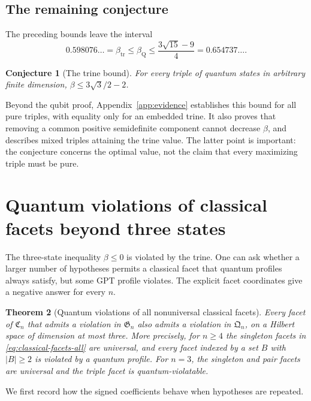 \documentclass[a4paper,11pt,onecolumn,unpublished]{quantumarticle}
\newtheorem{theorem}{Theorem}[section]
\newtheorem{conjecture}[theorem]{Conjecture}
\theoremstyle{definition}
\newcommand{\1}{\mathbf 1}
\newcommand{\Creg}{\mathfrak C}
\newcommand{\Qreg}{\mathfrak Q}
\newcommand{\Greg}{\mathfrak G}
\newcommand{\btr}{\beta_{\mathrm{tr}}}
\begin{document}
\subsection{The remaining conjecture}

The preceding bounds leave the interval
\begin{equation}\label{eq:remaining-interval}
 0.598076\ldots=\btr
 \le\beta_{\mathrm Q}
 \le\frac{3\sqrt{15}-9}{4}=0.654737\ldots.
\end{equation}

\begin{conjecture}[The trine bound]\label{conj:trine}
For every triple of quantum states in arbitrary finite dimension,
$\beta\le3\sqrt3/2-2$.
\end{conjecture}

Beyond the qubit proof, Appendix~\ref{app:evidence} establishes this bound for
all pure triples, with equality only for an embedded trine. It also proves
that removing a common positive semidefinite component cannot decrease
$\beta$, and describes mixed triples attaining the trine value. The latter
point is important: the conjecture concerns the optimal value, not the claim
that every maximizing triple must be pure.


\section{Quantum violations of classical facets beyond three states}
\label{sec:all-facets}

The three-state inequality $\beta\le0$ is violated by the trine. One can ask
whether a larger number of hypotheses permits a classical facet that quantum
profiles always satisfy, but some GPT profile violates. The explicit facet
coordinates give a negative answer for every $n$.

\begin{theorem}[Quantum violations of all nonuniversal classical facets]
\label{thm:all-facets}
Every facet of $\Creg_n$ that admits a violation in $\Greg_n$ also admits a
violation in $\Qreg_n$, on a Hilbert space of dimension at most three.
More precisely, for $n\ge4$ the singleton facets in
\eqref{eq:classical-facets-all} are universal, and every facet indexed by a set
$B$ with $|B|\ge2$ is violated by a quantum profile. For $n=3$, the singleton
and pair facets are universal and the triple facet is quantum-violatable.
\end{theorem}

We first record how the signed coefficients behave when hypotheses are
repeated.
\end{document}
